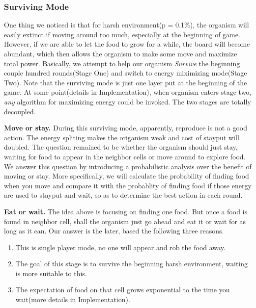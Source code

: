 \subsubsection{Surviving Mode}
One thing we noticed is that for harsh environment(p = 0.1\%), the
organism will easily extinct if moving around too much, especially at
the beginning of game.  However, if we are able to let the food to
grow for a while, the board will become abundant, which then allows
the organism to make some move and maximize total power.  Basically,
we attempt to help our organism \textit{Survive} the beginning couple
hundred rounds(Stage One) and switch to energy miximizing mode(Stage
Two). Note that the surviving mode is just one layer put at the
beginning of the game. At some point(details in Implementation), when
organism enters stage two, \textit{any} algorithm for maximizing energy could
be invoked. The two stages are totally decoupled.

\textbf{Move or stay.}  During this surviving mode, apparently,
reproduce is not a good action.  The energy spliting makes the
origanism weak and cost of stayput will doubled.  The question
remained to be whether the organism should just stay, waiting for food
to appear in the neighbor cells or move around to explore food. We
answer this question by introducing a probabilistic analysis over the
benefit of moving or stay.  More specifically, we will calculate the
probability of finding food when you move and compare it with the
probablity of finding food if those energy are used to stayput and
wait, so as to determine the best action in each round.

\textbf{Eat or wait.} The idea above is focusing on finding one food.
But once a food is found in neighbor cell, shall the organism just go
ahead and eat it or wait for as long as it can. Our answer is the
later, based the following three reasons.
\begin{enumerate}
\item This is single player mode, no one will appear and rob the food
  away.
\item The goal of this stage is to survive the beginning harsh
  environment, waiting is more suitable to this.
\item The expectation of food on that cell grows exponential to the
  time you wait(more details in Implementation).
\end{enumerate}

